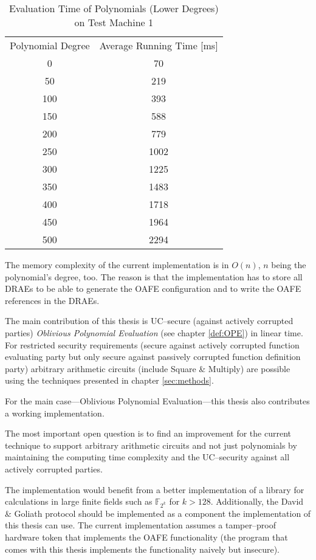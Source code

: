 \begin{table}[ht]
  \centering
  \begin{tabular}{|c|c|}
    Polynomial Degree & Average Running Time [ms] \\
      0 &   70 \\
     50 &  219 \\
    100 &  393 \\
    150 &  588 \\
    200 &  779 \\
    250 & 1002 \\
    300 & 1225 \\
    350 & 1483 \\
    400 & 1718 \\
    450 & 1964 \\
    500 & 2294 \\
  \end{tabular}
  \caption{Evaluation Time of Polynomials (Lower Degrees) on Test Machine 1}
  \label{tab:poly-deg-t-small}
\end{table}


%
%
\label{sec:mem-complexity}

The memory complexity of the current implementation is in $O(n)$, $n$ being the
polynomial's degree, too. The reason is that the implementation has to store all
DRAEs to be able to generate the OAFE configuration and to write the OAFE
references in the DRAEs.


%
%
\label{sec:contribution}

The main contribution of this thesis is UC--secure (against actively corrupted
parties) \emph{Oblivious Polynomial Evaluation} (see chapter \ref{def:OPE}) in
linear time. For restricted security requirements (secure against actively
corrupted function evaluating party but only secure against passively corrupted
function definition party) arbitrary arithmetic circuits (include Square \&
Multiply) are possible using the techniques presented in chapter
\ref{sec:methods}.

For the main case---Oblivious Polynomial Evaluation---this thesis also
contributes a working implementation.


%
%
\label{sec:outlook}

The most important open question is to find an improvement for the current
technique to support arbitrary arithmetic circuits and not just polynomials by
maintaining the computing time complexity and the UC--security against all
actively corrupted parties.

The implementation would benefit from a better implementation of a library for
calculations in large finite fields such as $\mathbb{F}_{2^{k}}$ for $k > 128$.
Additionally, the David \& Goliath protocol \cite{davidgoliath} should be
implemented as a component the implementation of this thesis can use. The
current implementation assumes a tamper--proof hardware token that implements
the OAFE functionality (the program \JWBtoken{} that comes with this thesis
implements the functionality naively but insecure).

